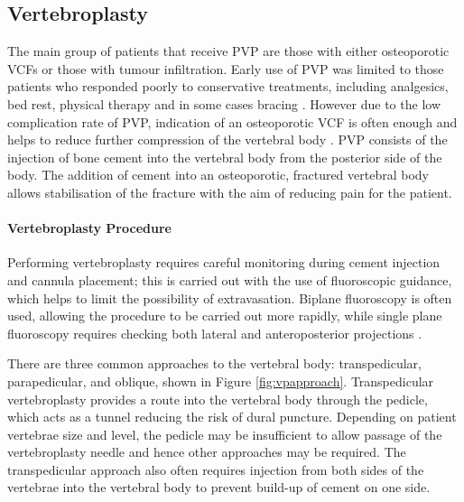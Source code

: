 \subsection{Vertebroplasty}\label{vertebroplasty}

The main group of patients that receive
PVP are those with either osteoporotic VCFs or those with tumour
infiltration. Early use of PVP was limited to those patients who
responded poorly to conservative treatments, including analgesics, bed
rest, physical therapy and in some cases bracing \cite{Mathis2001}. However due
to
the low complication rate of PVP, indication of an osteoporotic VCF is
often enough and helps to reduce further compression of the vertebral
body \cite{Diamond2006}. PVP consists of the injection of bone cement into the
vertebral body from the posterior side of the body. The addition of
cement into an osteoporotic, fractured vertebral body allows
stabilisation of the fracture with the aim of reducing pain for the
patient.

\paragraph{Vertebroplasty Procedure}\label{vertebroplasty-procedure}

Performing vertebroplasty requires careful monitoring during cement
injection and cannula placement; this is carried out with the use of
fluoroscopic guidance, which helps to limit the possibility of
extravasation. Biplane fluoroscopy is often used, allowing the procedure
to be carried out more rapidly, while single plane fluoroscopy requires
checking both lateral and anteroposterior projections \cite{Mathis2001}.

There are three common approaches to the vertebral body: transpedicular,
parapedicular, and oblique, shown in Figure \ref{fig:vpapproach}.
Transpedicular
vertebroplasty
provides
a
route into the vertebral body through the pedicle, which acts as a
tunnel reducing the risk of dural puncture. Depending on patient
vertebrae size and level, the pedicle may be insufficient to allow
passage of the vertebroplasty needle and hence other approaches may be
required. The transpedicular approach also often requires injection from
both sides of the vertebrae into the vertebral body to prevent build-up
of cement on one side.

